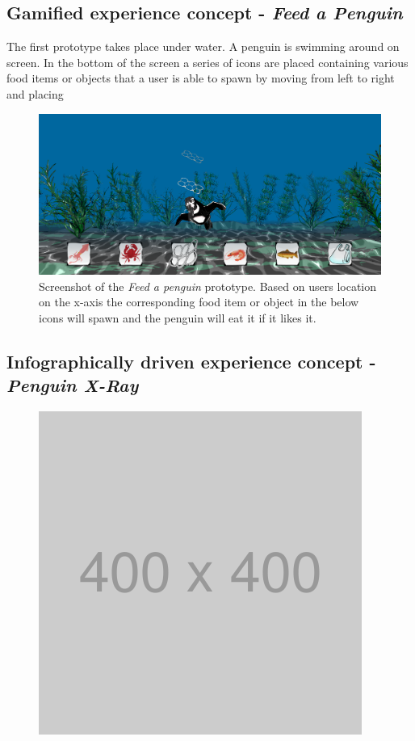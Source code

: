 \subsection{Gamified experience concept - \textit{Feed a Penguin}}
The first prototype takes place under water. A penguin is swimming around on screen. In the bottom of the screen a series of icons are placed containing various food items or objects that a user is able to spawn by moving from left to right and placing 
\begin{figure}[H]
	\centering
	\includegraphics[width=0.9\linewidth]{figure/Design/prototype1FeedAPenguin.png}
	\caption{Screenshot of the \textit{Feed a penguin} prototype. Based on users location on the x-axis the corresponding food item or object in the below icons will spawn and the penguin will eat it if it likes it.}
	\label{fig:prototypeGamified}
\end{figure}

\subsection{Infographically driven experience concept - \textit{Penguin X-Ray}}
\begin{figure}[H]
	\centering
	\includegraphics[width=0.8\linewidth]{figure/placeholder.png}
	\caption{}
	\label{fig:prototypeInfographic}
\end{figure}


